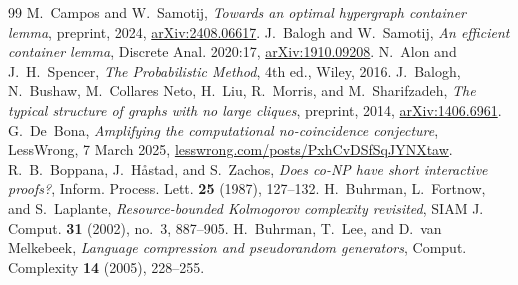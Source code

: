 \documentclass[11pt]{article}
\theoremstyle{remark}
\begin{document}
\begin{thebibliography}{99}
M.~Campos and W.~Samotij,
\newblock \emph{Towards an optimal hypergraph container lemma},
\newblock preprint, 2024, \href{https://arxiv.org/abs/2408.06617}{arXiv:2408.06617}.
J.~Balogh and W.~Samotij,
\newblock \emph{An efficient container lemma},
\newblock Discrete Anal. 2020:17, \href{https://arxiv.org/abs/1910.09208}{arXiv:1910.09208}.
N.~Alon and J.~H.~Spencer,
\newblock \emph{The Probabilistic Method}, 4th ed.,
\newblock Wiley, 2016.
J.~Balogh, N.~Bushaw, M.~Collares Neto, H.~Liu, R.~Morris, and M.~Sharifzadeh,
\newblock \emph{The typical structure of graphs with no large cliques},
\newblock preprint, 2014, \href{https://arxiv.org/abs/1406.6961}{arXiv:1406.6961}.
G.~De~Bona,
\newblock \emph{Amplifying the computational no-coincidence conjecture},
\newblock LessWrong, 7 March 2025, \href{https://www.lesswrong.com/posts/PxhCvDSfSqJYNXtaw/amplifying-the-computational-no-coincidence-conjecture}{lesswrong.com/posts/PxhCvDSfSqJYNXtaw}.
R.~B.~Boppana, J.~H{\aa}stad, and S.~Zachos,
\newblock \emph{Does co-{NP} have short interactive proofs?},
\newblock Inform. Process. Lett. \textbf{25} (1987), 127--132.
H.~Buhrman, L.~Fortnow, and S.~Laplante,
\newblock \emph{Resource-bounded {K}olmogorov complexity revisited},
\newblock SIAM J. Comput. \textbf{31} (2002), no.~3, 887--905.
H.~Buhrman, T.~Lee, and D.~van Melkebeek,
\newblock \emph{Language compression and pseudorandom generators},
\newblock Comput. Complexity \textbf{14} (2005), 228--255.
\end{thebibliography}
\end{document}
